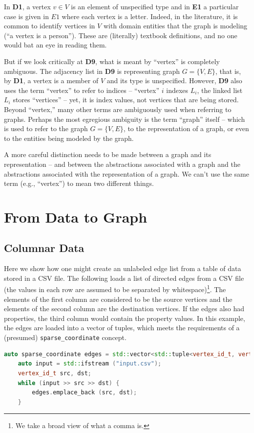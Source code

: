 In \textbf{D1}, a vertex $v \in V$ is an element of unspecified type and in \textbf{E1} a particular case is given in $E1$ where
each vertex is a letter.  Indeed, in the literature, it is common to identify vertices in $V$ with domain entities that the graph
is modeling (``a vertex is a person'').  These are (literally) textbook definitions, and no one would bat an eye in reading them.

But if we look critically at \textbf{D9}, what is meant by ``vertex'' is completely ambiguous.  The adjacency list
in \textbf{D9} is representing graph $G=\{ V, E\}$, that is, by \textbf{D1}, a vertex is a member of $V$ and its type is
unspecified.  However, \textbf{D9} also uses the term ``vertex'' to refer to indices -- ``vertex'' $i$ indexes $L_i$, the linked list   
$L_i$ stores ``vertices'' -- yet, it is index values, not vertices that are being stored.  Beyond ``vertex,'' many other terms are
 ambiguously used when referring to graphs.  Perhaps the most egregious ambiguity is the term ``graph'' itself -- which is used to 
refer to the graph $G=\{ V, E \}$, to the representation of a graph, or even to the entities being modeled by the graph.

A more careful distinction needs to be made between a graph and its representation -- and between the abstractions associated with
a graph and the abstractions associated with the representation of a graph.  We can't use the same term (e.g., ``vertex'') to mean
two different things.


\section{From Data to Graph}

\subsection{Columnar Data}
Here we show how one might create an unlabeled edge list from a table of data stored in a CSV file.  The following loads a list of directed edges from a CSV file (the values in each row are assumed to be separated by whitespace)\footnote{We take a broad view of what a comma is.}.
The elements of the first column are considered to be the source vertices and the elements of
the second column are the destination vertices. If the edges also had properties, the third column
would contain the property values.  In this example, the edges are loaded into a vector of tuples, which meets the requirements of a (presumed) \lstinline{sparse_coordinate} concept.
\begin{lstlisting}[language=C++]
    auto sparse_coordinate edges = std::vector<std::tuple<vertex_id_t, vertex_id_t>;
    auto input = std::ifstream ("input.csv");
    vertex_id_t src, dst;
    while (input >> src >> dst) {
        edges.emplace_back (src, dst);
    }
\end{lstlisting}

